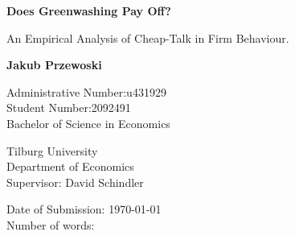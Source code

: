 \begin{titlepage}
    \begin{center}
        \vspace*{1cm}
 
        \Huge
        \textbf{Does Greenwashing Pay Off?}
 
        \vspace{0.5cm}
        An Empirical Analysis of Cheap-Talk in Firm Behaviour.
        
        \vspace{1.5cm}
        
        \textbf{Jakub Przewoski}
        
        \vspace{0.5cm}
        \Large
        Administrative Number:\@ u431929\\ 
        Student Number:\@ 2092491 \\
        Bachelor of Science in Economics \\
        
        \vfill
        
        Tilburg University\\
        Department of Economics\\
        Supervisor: David Schindler\\
        
        \vspace{0.8cm}
        
        Date of Submission: \today{} \\
        Number of words:

            
    \end{center}
\end{titlepage}
